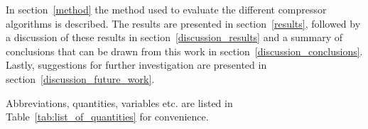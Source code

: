 \documentclass[../main2.tex]{subfiles}
\providecommand{\rootdir}{..}
\begin{document}
In section~\ref{method} the method used to evaluate the different compressor algorithms is described. The results are presented in section~\ref{results}, followed by a discussion of these results in section~\ref{discussion_results} and a summary of conclusions that can be drawn from this work in section~\ref{discussion_conclusions}. Lastly, suggestions for further investigation are presented in section~\ref{discussion_future_work}.  

Abbreviations, quantities, variables etc. are listed in Table~\ref{tab:list_of_quantities} for convenience.

\end{document}
